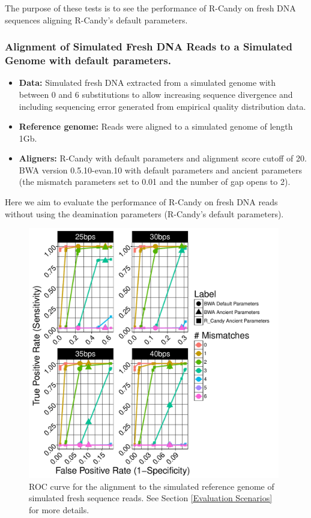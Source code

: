 \documentclass[11pt,a4paper]{report}
\begin{document}
 The purpose of these tests is to see the performance of R-Candy on 
 fresh DNA sequences aligning R-Candy's default parameters. 



 \subsubsection {Alignment of Simulated Fresh DNA Reads to a Simulated 
 Genome with default parameters.}
 \label {Alignment of Simulated Fresh DNA Reads to a Simulated Genome 
 with default parameters.}
 
  \begin{itemize}

   \item \textbf{Data:} Simulated fresh DNA extracted from a simulated genome 
   with between 0 and 6 substitutions to allow increasing sequence divergence
   and including sequencing error generated from empirical quality distribution data.
 
   
   \item \textbf{Reference genome:} Reads were aligned to a simulated genome of 
length 1Gb.

    \item \textbf{Aligners:} 
R-Candy with default parameters and alignment score cutoff of 20. \\
BWA version 0.5.10-evan.10 with default parameters and ancient parameters 
(the mismatch parameters set to
0.01 and the number of gap opens to 2)\cite{green2010draft}.

  \end{itemize}
 
Here we aim to evaluate the performance of R-Candy on fresh DNA reads 
without using the deamination parameters (R-Candy's default parameters).


\begin{figure}[H]
\centering
\includegraphics[width=11cm]{pictures/f_DS3_emp.pdf}
\caption{
ROC curve for the alignment to the simulated reference genome of simulated 
fresh sequence reads. See Section \ref{Evaluation Scenarios} 
for more details.}
\label{DS3_emp}
\end{figure}
\end{document}
